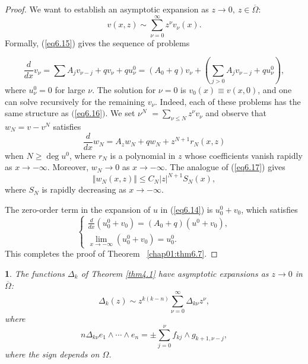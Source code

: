 \documentclass{surv-l}
\theoremstyle{plain}
\newtheorem{cor}[theorem]{\sc{Corollary}}
\theoremstyle{definition}
\numberwithin{equation}{chapter}
\begin{document}
\begin{proof}
We want to establish an asymptotic expansion as $z\rightarrow 0,\ z\in\overline{\Omega}$:
\begin{equation}\label{eq6.18}
v(x, z)\sim\sum_{\nu=0}^{\infty}z^{\nu}v_{\nu}(x).
\end{equation}
Formally, (\ref{eq6.15}) gives the sequence of problems

\begin{equation}\label{eq6.19}
\displaystyle \frac{d}{dx}v_{\nu}=\sum A_{j}v_{\nu-j}+qv_{\nu} +qu_{\nu}^{0}=(A_{0}+q)v_{\nu}+\left(\sum_{j>0}A_{j}v_{\nu-j}+qu_{\nu}^{0}\right),
\end{equation}
where $u_{\nu}^{0}=0$ for large $\nu$. The solution for $\nu=0$ is
$v_{0}(x)\equiv v(x, 0)$, and one can solve recursively for the
remaining $v_{\nu}$. Indeed, each of these problems has the same
structure as $($\ref{eq6.16}$)$. We set $\nu^{N}$ $=\sum_{\nu\leq N}z^{\nu}v_{\nu}$ and observe that $w_{N}=v-v^{N}$ satisfies
\begin{equation*}
\frac{d}{dx}w_{N}=A_{z}w_{N}+qw_{N}+z^{N+1}r_{N}(x,z)
\end{equation*}
when $N\geq\deg u^{0}$, where $r_{N}$ is a polynomial in $z$ whose coefficients vanish rapidly as $ x\rightarrow-\infty$. Moreover, $w_{N}\rightarrow 0$ as $ x\rightarrow-\infty$. The analogue of (\ref{eq6.17}) gives
\begin{equation}\label{eq6.20}
\Vert w_{N}(x,z)\Vert\leq C_{N}|z|^{N+1}S_{N}(x),
\end{equation}
where $S_{N}$ is rapidly decreasing as $ x\rightarrow-\infty$.

The zero-order term in the expansion of $u$ in (\ref{eq6.14}) is $u_{0}^{0}+v_{0}$, which satisfies
\begin{equation*}
\left\{\begin{array}{l}
\frac{d}{dx}(u_{0}^{0}+v_{0})=(A_{0}+q)(u^{0}+v_{0}),\\
\lim_{x\rightarrow-\infty}(u_{0}^{0}+v_{0})=u_{0}^{0}.
\end{array}\right.
\end{equation*}
This completes the proof of Theorem ~\ref{chap01:thm6.7}.
\end{proof}
\setcounter{theorem}{20}
\begin{cor}\label{chap01:coro6.21}
The functions $\Delta_{k}$ of Theorem \emph{\ref{thm4.1}} have asymptotic expansions as $z\rightarrow 0$ in $\overline{\Omega}$\emph{:}
\setcounter{equation}{21}
\begin{equation}\label{eq6.22}
\Delta_{k}(z)\sim z^{k(k-n)}\sum_{\nu=0}^{\infty}\Delta_{k\nu}z^{\nu},
\end{equation}
where
\begin{equation}\label{eq6.23}
n\Delta_{k\nu}e_{1}\wedge\cdots\wedge e_{n}=\pm\sum_{j=0}^{\nu}f_{kj}\wedge g_{k+1,\nu-j},
\end{equation}
where the sign depends on $\Omega$.
\end{cor}
\end{document}
